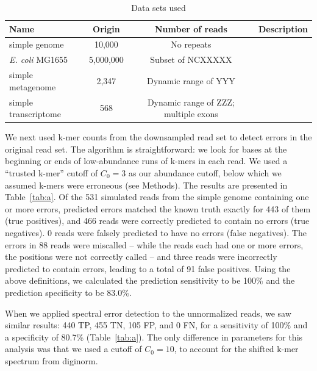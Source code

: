 \documentclass{article}
\begin{document}


\begin{table}
\begin{tabular}{|l|c|c|l|}
\hline
Name & Origin & Number of reads & Description \\
\hline
simple genome & 10,000 & No repeats\\
{\em E. coli} MG1655 & 5,000,000 & Subset of NCXXXXX \\
simple metagenome & 2,347 & Dynamic range of YYY \\
simple transcriptome & 568 & Dynamic range of ZZZ; multiple exons\\
\hline
\end{tabular}
\label{tab:data}

\caption{Data sets used}
\end{table}

We next used k-mer counts from the downsampled read set to detect
errors in the original read set.  The algorithm is straightforward: we
look for bases at the beginning or ends of low-abundance runs of
k-mers in each read. We used a ``trusted k-mer'' cutoff of $C_0 = 3$
as our abundance cutoff, below which we assumed k-mers were erroneous
(see Methods).  The results are presented in Table~\ref{tab:a}.  Of
the 531 simulated reads from the simple genome containing one or more
errors, predicted errors matched the known truth exactly for 443 of
them (true positives), and 466 reads were correctly predicted to
contain no errors (true negatives). 0 reads were falsely predicted to
have no errors (false negatives). The errors in 88 reads were
miscalled -- while the reads each had one or more errors, the
positions were not correctly called -- and three reads were
incorrectly predicted to contain errors, leading to a total of 91
false positives.  Using the above definitions, we calculated the
prediction sensitivity to be 100\% and the prediction specificity to
be 83.0\%.


When we applied spectral error detection to the unnormalized reads, we
saw similar results: 440 TP, 455 TN, 105 FP, and 0 FN, for a
sensitivity of 100\% and a specificity of 80.7\% (Table~\ref{tab:a}). The only difference
in parameters for this analysis was that we used a cutoff of $C_0=10$,
to account for the shifted k-mer spectrum from diginorm.
\end{document}

